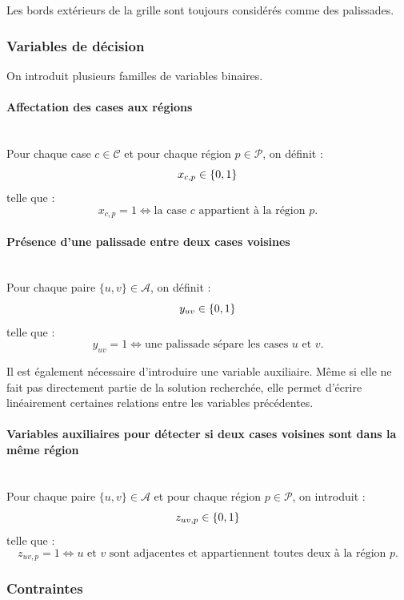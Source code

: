 Les bords extérieurs de la grille sont toujours considérés comme des palissades.

\subsubsection{Variables de décision}

On introduit plusieurs familles de variables binaires.

\paragraph{Affectation des cases aux régions}
\mbox{}\\

Pour chaque case \(c \in \mathcal{C}\) et pour chaque région \(p \in \mathcal{P}\), on définit :
\[
x_{c,p} \in \{0,1\}
\]
telle que :
\[
x_{c,p} = 1 \iff \text{la case } c \text{ appartient à la région } p.
\]

\paragraph{Présence d'une palissade entre deux cases voisines}
\mbox{}\\

Pour chaque paire \(\{u,v\} \in \mathcal{A}\), on définit :
\[
y_{uv} \in \{0,1\}
\]
telle que :
\[
y_{uv} = 1 \iff \text{une palissade sépare les cases } u \text{ et } v.
\]

Il est également nécessaire d'introduire une variable auxiliaire. Même si elle ne fait pas directement partie de la solution recherchée, elle permet d'écrire linéairement certaines relations entre les variables précédentes.

\paragraph{Variables auxiliaires pour détecter si deux cases voisines sont dans la même région}
\mbox{}\\

Pour chaque paire \(\{u,v\} \in \mathcal{A}\) et pour chaque région \(p \in \mathcal{P}\), on introduit :
\[
z_{uv,p} \in \{0,1\}
\]
telle que :
\[
z_{uv,p} = 1 \iff u \text{ et } v \text{ sont adjacentes et appartiennent toutes deux à la région } p.
\]


\subsubsection{Contraintes}

